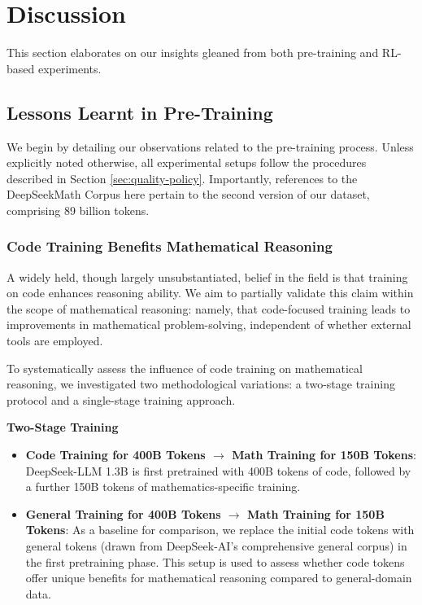 {\section{Discussion}
This section elaborates on our insights gleaned from both pre-training and RL-based experiments.

\subsection{Lessons Learnt in Pre-Training}

We begin by detailing our observations related to the pre-training process. Unless explicitly noted otherwise, all experimental setups follow the procedures described in Section \ref{sec:quality-policy}. Importantly, references to the DeepSeekMath Corpus here pertain to the second version of our dataset, comprising 89 billion tokens.

\subsubsection{Code Training Benefits Mathematical Reasoning}

A widely held, though largely unsubstantiated, belief in the field is that training on code enhances reasoning ability. We aim to partially validate this claim within the scope of mathematical reasoning: namely, that code-focused training leads to improvements in mathematical problem-solving, independent of whether external tools are employed.

To systematically assess the influence of code training on mathematical reasoning, we investigated two methodological variations: a two-stage training protocol and a single-stage training approach.

\textbf{Two-Stage Training}

\begin{itemize}[topsep=0pt]
    \item \textbf{Code Training for 400B Tokens $\rightarrow$ Math Training for 150B Tokens}: DeepSeek-LLM 1.3B is first pretrained with 400B tokens of code, followed by a further 150B tokens of mathematics-specific training.
    \item \textbf{General Training for 400B Tokens $\rightarrow$ Math Training for 150B Tokens}: As a baseline for comparison, we replace the initial code tokens with general tokens (drawn from DeepSeek-AI’s comprehensive general corpus) in the first pretraining phase. This setup is used to assess whether code tokens offer unique benefits for mathematical reasoning compared to general-domain data.
\end{itemize}

}
